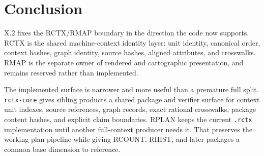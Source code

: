 \section{Conclusion}

X.2 fixes the RCTX/RMAP boundary in the direction the code now supports. RCTX
is the shared machine-context identity layer: unit identity, canonical order,
context hashes, graph identity, source hashes, aligned attributes, and
crosswalks. RMAP is the separate owner of rendered and cartographic
presentation, and remains reserved rather than implemented.

The implemented surface is narrower and more useful than a premature full
split. \texttt{rctx-core} gives sibling products a shared package and verifier
surface for context unit indexes, source references, graph records, exact
rational crosswalks, package content hashes, and explicit claim boundaries.
RPLAN keeps the current \texttt{.rctx} implementation until another full-context
producer needs it. That preserves the working plan pipeline while giving RCOUNT,
RHIST, and later packages a common base dimension to reference.

